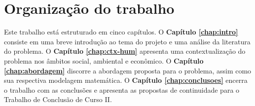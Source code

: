 \section{Organização do trabalho} %
\label{sec:organização_do_trabalho}
Este trabalho está estruturado em cinco capítulos. O \textbf{Capítulo \ref{chap:intro}} consiste em uma breve introdução ao tema do projeto e uma análise da literatura do problema. O \textbf{Capítulo \ref{chap:ctx-hum}} apresenta uma contextualização do problema nos âmbitos social, ambiental e econômico. O \textbf{Capítulo \ref{chap:abordagem}} discorre a abordagem proposta para o problema, assim como sua respectiva modelagem matemática. O \textbf{Capítulo \ref{chap:conclusoes}} encerra o trabalho com as conclusões e apresenta as propostas de continuidade para o Trabalho de Conclusão de Curso II.




